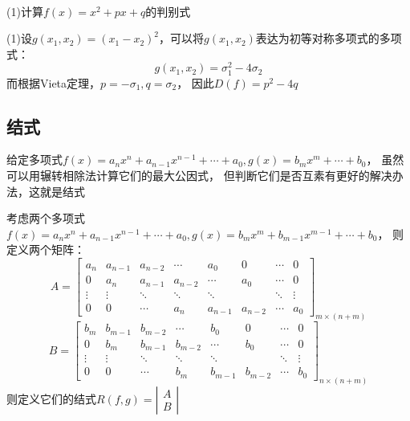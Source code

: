 ~

\begin{exercise}[判别式的计算]
  (1)计算$f(x) = x^2 + px + q$的判别式
\end{exercise}

\begin{solution}
  (1)设$g(x_1,x_2) = (x_1 - x_2)^2$，可以将$g(x_1,x_2)$表达为初等对称多项式的多项式：
  \begin{equation*}
    g(x_1,x_2) = \sigma_1^2 - 4\sigma_2
  \end{equation*}
  而根据Vieta定理，$p = -\sigma_1, q = \sigma_2$，
  因此$D(f) = p^2 - 4q$
\end{solution}

\subsection{结式}

给定多项式$f(x) = a_nx^n + a_{n-1}x^{n-1} + \cdots + a_0, g(x) = b_mx^m + \cdots + b_0$，
虽然可以用辗转相除法计算它们的最大公因式，
但判断它们是否互素有更好的解决办法，这就是结式

\begin{definition}[结式]
  考虑两个多项式$f(x) = a_nx^n + a_{n-1}x^{n-1} + \cdots + a_0, g(x) = b_mx^m + b_{m-1}x^{m-1} + \cdots + b_0$，
  则定义两个矩阵：
  \begin{equation*}
    A = \left[
      \begin{array}{cccccccc}
        a_n&a_{n-1}&a_{n-2}&\cdots&a_0&0&\cdots&0 \\
           0&a_n&a_{n-1}&a_{n-2}&\cdots&a_0&\cdots&0 \\
           \vdots&\vdots&\ddots&\ddots&\ddots&&\ddots&\vdots \\
           0&0&\cdots&a_n&a_{n-1}&a_{n-2}&\cdots&a_0
      \end{array}
    \right]_{m \times (n + m)}
  \end{equation*}
  \begin{equation*}
    B = \left[
      \begin{array}{cccccccc}
        b_m&b_{m-1}&b_{m-2}&\cdots&b_0&0&\cdots&0 \\
        0&b_m&b_{m-1}&b_{m-2}&\cdots&b_0&\cdots&0 \\
        \vdots&\vdots&\ddots&\ddots&\ddots&&\ddots&\vdots \\
        0&0&\cdots&b_m&b_{m-1}&b_{m-2}&\cdots&b_0
      \end{array}
    \right]_{n \times (n + m)}
  \end{equation*}
  则定义它们的结式$R(f,g) = \left|
    \begin{array}{c}
      A\\
      B
    \end{array}
  \right|$
\end{definition}

